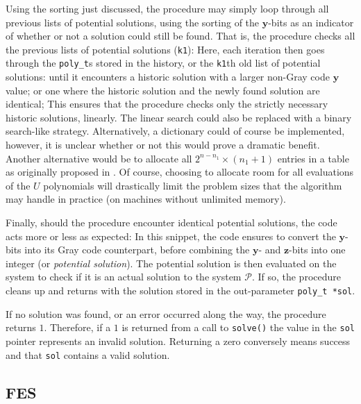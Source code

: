 Using the sorting just discussed, the procedure may simply loop through all previous lists of potential solutions, using the sorting of the $\mathbf{y}$-bits as an indicator of whether or not a solution could still be found. That is, the procedure checks all the previous lists of potential solutions (\texttt{k1}):
Here, each iteration then goes through the \texttt{poly\_t}s stored in the history, or the \texttt{k1}th old list of potential solutions:
until it encounters a historic solution with a larger non-Gray code $\mathbf{y}$ value; 
or one where the historic solution and the newly found solution are identical;
This ensures that the procedure checks only the strictly necessary historic solutions, linearly. The linear search could also be replaced with a binary search-like strategy. Alternatively, a dictionary could of course be implemented, however, it is unclear whether or not this would prove a dramatic benefit. Another alternative would be to allocate all $2^{n - n_1} \times (n_1 + 1)$ entries in a table as originally proposed in \cite{eurocrypt-2021-30841}. Of course, choosing to allocate room for all evaluations of the $U$ polynomials will drastically limit the problem sizes that the algorithm may handle in practice (on machines without unlimited memory).

Finally, should the procedure encounter identical potential solutions, the code acts more or less as expected:
In this snippet, the code ensures to convert the $\mathbf{y}$-bits into its Gray code counterpart, before combining the $\mathbf{y}$- and $\mathbf{z}$-bits into one integer (or \textit{potential solution}). The potential solution is then evaluated on the system to check if it is an actual solution to the system $\mathcal{P}$. If so, the procedure cleans up and returns with the solution stored in the out-parameter \texttt{poly\_t *sol}.

If no solution was found, or an error occurred along the way, the procedure returns $1$. Therefore, if a $1$ is returned from a call to \texttt{solve()} the value in the \texttt{sol} pointer represents an invalid solution. Returning a zero conversely means success and that \texttt{sol} contains a valid solution.

\subsection{FES} \label{sec:impl:c:fes}
